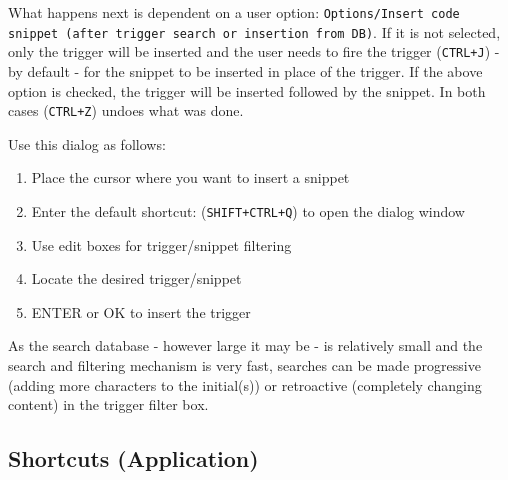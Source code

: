 What happens next is dependent on a user option: \texttt{Options/Insert code snippet (after trigger search or insertion from DB)}.
If it is not selected, only the trigger will be inserted and the user needs to fire the
trigger (\texttt{CTRL+J}) - by default - for the snippet to be inserted in place of the trigger.
If the above option is checked, the trigger will be inserted followed by the snippet.
In both cases (\texttt{CTRL+Z}) undoes what was done.

Use this dialog as follows:
\begin{enumerate}
  \item Place the cursor where you want to insert a snippet
  \item Enter the default shortcut: (\texttt{SHIFT+CTRL+Q}) to open the dialog window
  \item Use edit boxes for trigger/snippet filtering
  \item Locate the desired trigger/snippet
  \item ENTER or OK to insert the trigger
\end{enumerate}

As the search database - however large it may be - is relatively small and the search and filtering
mechanism is very fast, searches can be made progressive (adding more characters to the initial(s))
or retroactive (completely changing content) in the trigger filter box.


\hypertarget{dlg_skh_map_shortcuts}{}
\subsection{Shortcuts (Application)}

